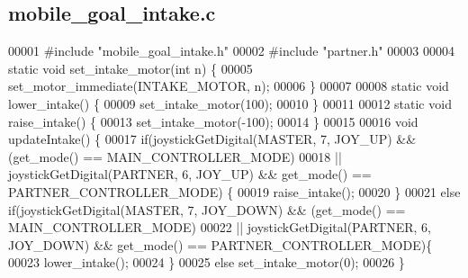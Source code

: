 \subsection{mobile\+\_\+goal\+\_\+intake.\+c}
\label{mobile__goal__intake_8c_source}

\begin{DoxyCode}
00001 \textcolor{preprocessor}{#include "mobile_goal_intake.h"}
00002 \textcolor{preprocessor}{#include "partner.h"}
00003 
00004 \textcolor{keyword}{static} \textcolor{keywordtype}{void} set_intake_motor(\textcolor{keywordtype}{int} n) \{
00005   set_motor_immediate(INTAKE_MOTOR, n);
00006 \}
00007 
00008 \textcolor{keyword}{static} \textcolor{keywordtype}{void} lower_intake() \{
00009   set_intake_motor(100);
00010 \}
00011 
00012 \textcolor{keyword}{static} \textcolor{keywordtype}{void} raise_intake() \{
00013   set_intake_motor(-100);
00014 \}
00015 
00016 \textcolor{keywordtype}{void} updateIntake() \{
00017   \textcolor{keywordflow}{if}(joystickGetDigital(MASTER, 7, JOY_UP) && (get_mode() == 
      MAIN_CONTROLLER_MODE)
00018   || joystickGetDigital(PARTNER, 6, JOY_UP) && get_mode() == 
      PARTNER_CONTROLLER_MODE) \{
00019     raise_intake();
00020   \}
00021   \textcolor{keywordflow}{else} \textcolor{keywordflow}{if}(joystickGetDigital(MASTER, 7, JOY_DOWN) && (get_mode() == 
      MAIN_CONTROLLER_MODE)
00022   || joystickGetDigital(PARTNER, 6, JOY_DOWN) && get_mode() == 
      PARTNER_CONTROLLER_MODE)\{
00023     lower_intake();
00024   \}
00025   \textcolor{keywordflow}{else} set_intake_motor(0);
00026 \}
\end{DoxyCode}
